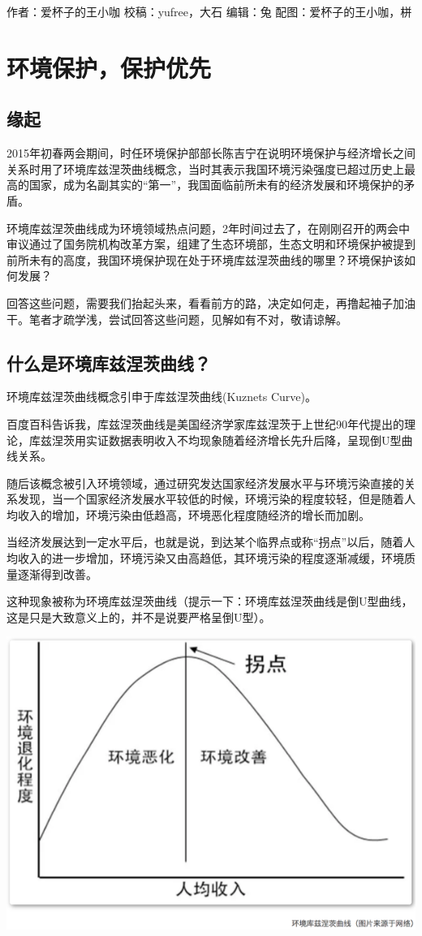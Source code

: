 \documentclass[]{book}
\begin{document}
作者：爱杯子的王小咖 校稿：yufree，大石 编辑：兔
配图：爱杯子的王小咖，栟

\section{环境保护，保护优先}

\subsection{缘起}

2015年初春两会期间，时任环境保护部部长陈吉宁在说明环境保护与经济增长之间关系时用了环境库兹涅茨曲线概念，当时其表示我国环境污染强度已超过历史上最高的国家，成为名副其实的``第一''，我国面临前所未有的经济发展和环境保护的矛盾。

环境库兹涅茨曲线成为环境领域热点问题，2年时间过去了，在刚刚召开的两会中审议通过了国务院机构改革方案，组建了生态环境部，生态文明和环境保护被提到前所未有的高度，我国环境保护现在处于环境库兹涅茨曲线的哪里？环境保护该如何发展？

回答这些问题，需要我们抬起头来，看看前方的路，决定如何走，再撸起袖子加油干。笔者才疏学浅，尝试回答这些问题，见解如有不对，敬请谅解。

\subsection{什么是环境库兹涅茨曲线？}

环境库兹涅茨曲线概念引申于库兹涅茨曲线(Kuznets Curve)。

百度百科告诉我，库兹涅茨曲线是美国经济学家库兹涅茨于上世纪90年代提出的理论，库兹涅茨用实证数据表明收入不均现象随着经济增长先升后降，呈现倒U型曲线关系。

随后该概念被引入环境领域，通过研究发达国家经济发展水平与环境污染直接的关系发现，当一个国家经济发展水平较低的时候，环境污染的程度较轻，但是随着人均收入的增加，环境污染由低趋高，环境恶化程度随经济的增长而加剧。

当经济发展达到一定水平后，也就是说，到达某个临界点或称``拐点''以后，随着人均收入的进一步增加，环境污染又由高趋低，其环境污染的程度逐渐减缓，环境质量逐渐得到改善。

这种现象被称为环境库兹涅茨曲线（提示一下：环境库兹涅茨曲线是倒U型曲线，这是只是大致意义上的，并不是说要严格呈倒U型）。

\includegraphics[width=8.33in]{images/huanjing1}
\end{document}
